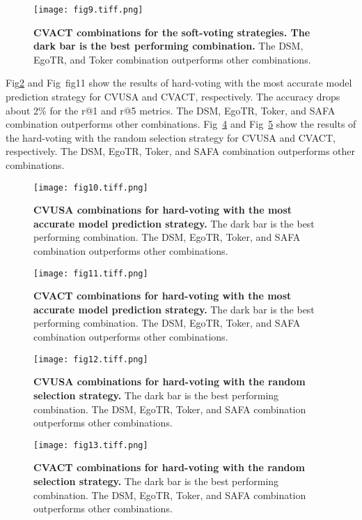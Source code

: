 \documentclass[10pt,letterpaper]{article}
\begin{document}
\begin{figure}[!ht]
  \caption{{\bf CVACT combinations for the soft-voting strategies. The dark bar is the best performing combination.} The DSM, EgoTR, and Toker combination outperforms other combinations. }
  \texttt{[image: fig9.tiff.png]}
  
  \label{fig9}
\end{figure}

Fig\ref{fig10} and Fig~{fig11} show the results of hard-voting with the most accurate model prediction strategy for CVUSA and CVACT, respectively. The accuracy drops about 2\% for the r@1 and r@5 metrics. The DSM, EgoTR, Toker, and SAFA combination outperforms other combinations. Fig~\ref{fig12} and Fig~\ref{fig13} show the results of the hard-voting with the random selection strategy for CVUSA and CVACT, respectively. The DSM, EgoTR, Toker, and SAFA combination outperforms other combinations.


\begin{figure}[!ht]
  \caption{{\bf CVUSA combinations for hard-voting with the most accurate model prediction strategy.} The dark bar is the best performing combination. The DSM, EgoTR, Toker, and SAFA combination outperforms other combinations.}
  \texttt{[image: fig10.tiff.png]}
  \label{fig10}
\end{figure}

\begin{figure}[!ht]
  \caption{{\bf CVACT combinations for hard-voting with the most accurate  model prediction strategy.} The dark bar is the best performing combination. The DSM, EgoTR, Toker, and SAFA combination outperforms other combinations.}
  \texttt{[image: fig11.tiff.png]}
  \label{fig11}
\end{figure}

\begin{figure}[!ht]
  \caption{{\bf CVUSA combinations for hard-voting with the random selection strategy.} The dark bar is the best performing combination. The DSM, EgoTR, Toker, and SAFA combination outperforms other combinations. }
  \texttt{[image: fig12.tiff.png]}
  \label{fig12}
\end{figure}

\begin{figure}[!ht]
  \caption{{\bf CVACT combinations for hard-voting with the random selection strategy.} The dark bar is the best performing combination. The DSM, EgoTR, Toker, and SAFA combination outperforms other combinations.}
  \texttt{[image: fig13.tiff.png]}
  \label{fig13}
\end{figure}
\end{document}
